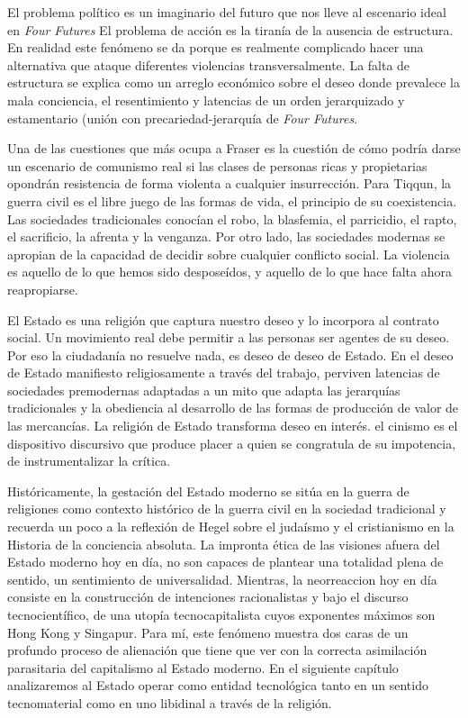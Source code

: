 El problema político es un imaginario del futuro que nos lleve al escenario ideal en \emph{Four Futures} El problema de acción es la tiranía de la ausencia de estructura. En realidad este fenómeno se da porque es realmente complicado hacer una alternativa que ataque diferentes violencias transversalmente. La falta de estructura se explica como un arreglo económico sobre el deseo donde prevalece la mala conciencia, el resentimiento y latencias de un orden jerarquizado y estamentario (unión con precariedad-jerarquía de \emph{Four Futures}.

Una de las cuestiones que más ocupa a Fraser es la cuestión de cómo podría darse un escenario de comunismo real si las clases de personas ricas y propietarias opondrán resistencia de forma violenta a cualquier insurrección. Para Tiqqun, la guerra civil es el libre juego de las formas de vida, el principio de su coexistencia. Las sociedades tradicionales conocían el robo, la blasfemia, el parricidio, el rapto, el sacrificio, la afrenta y la venganza. Por otro lado, las sociedades modernas se apropian de la capacidad de decidir sobre cualquier conflicto social. La violencia es aquello de lo que hemos sido desposeídos, y aquello de lo que hace falta ahora reapropiarse.

El Estado es una religión que captura nuestro deseo y lo incorpora al contrato social. Un movimiento real debe permitir a las personas ser agentes de su deseo. Por eso la ciudadanía no resuelve nada, es deseo de deseo de Estado. En el deseo de Estado manifiesto religiosamente a través del trabajo, perviven latencias de sociedades premodernas adaptadas a un mito que adapta las jerarquías tradicionales y la obediencia al desarrollo de las formas de producción de valor de las mercancías. La religión de Estado transforma deseo en interés. el cinismo es el dispositivo discursivo que produce placer a quien se congratula de su impotencia, de instrumentalizar la crítica.

Históricamente, la gestación del Estado moderno se sitúa en la guerra de religiones como contexto histórico de la guerra civil en la sociedad tradicional y recuerda un poco a la reflexión de Hegel sobre el judaísmo y el cristianismo en la Historia de la conciencia absoluta. La impronta ética de las visiones afuera del Estado moderno hoy en día, no son capaces de plantear una totalidad plena de sentido, un sentimiento de universalidad. Mientras, la neorreaccion hoy en día consiste en la construcción de intenciones racionalistas y bajo el discurso tecnocientífico, de una utopía tecnocapitalista cuyos exponentes máximos son Hong Kong y Singapur. Para mí, este fenómeno muestra dos caras de un profundo proceso de alienación que tiene que ver con la correcta asimilación parasitaria del capitalismo al Estado moderno. En el siguiente capítulo analizaremos al Estado operar como entidad tecnológica tanto en un sentido tecnomaterial como en uno libidinal a través de la religión.